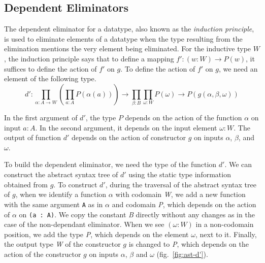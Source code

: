 \documentclass[sigplan,10pt]{acmart}
\begin{document}
\subsection{Dependent Eliminators}
\label{sec:sec3.2}

The dependent eliminator for a datatype, also known as the \emph{induction principle}, is used to eliminate elements of a datatype when the type resulting from the elimination mentions the very element being eliminated. For the inductive type $W$, the induction principle says that to define a mapping $f' : (w : W) \rightarrow P(w)$, it suffices to define the action of $f'$ on $g$. To define the action of $f'$ on $g$, we need an element of the following type.
\begin{equation}
d' : \prod_{\alpha : A \rightarrow W} (\prod_{a : A} P(\alpha (a))) \rightarrow  \prod_{\beta : B} \prod_{\omega : W} P(\omega) \rightarrow P (g(\alpha, \beta, \omega)) \nonumber
\end{equation}

In the first argument of $d'$, the type $P$ depends on the action of the function $\alpha$ on input $a : A$. In the second argument, it depends on the input element $\omega : W$. The output of function $d'$ depends on the action of constructor $g$ on inputs $\alpha$, $\beta$, and $\omega$.

To build the dependent eliminator, we need the type of the function $d'$. We can construct the abstract syntax tree of $d'$ using the static type information obtained from $g$. To construct $d'$, during the traversal of the abstract syntax tree of $g$, when we identify a function $\alpha$ with codomain \emph{W}, we add a new function with the same argument {\tt A} as in $\alpha$ and codomain \emph{P}, which depends on the action of $\alpha$ on {\tt (a : A)}. We copy the constant \emph{B} directly without any changes as in the case of the non-dependant eliminator. When we see $(\omega : W)$ in a non-codomain position, we add the type \emph{P}, which depends on the element $\omega$, next to it. Finally, the output type \emph{W} of the constructor $g$ is changed to \emph{P}, which depends on the action of the constructor $g$ on inputs $\alpha$, $\beta$ and $\omega$ (fig.~\ref{fig:ast-d'}).

\end{document}
